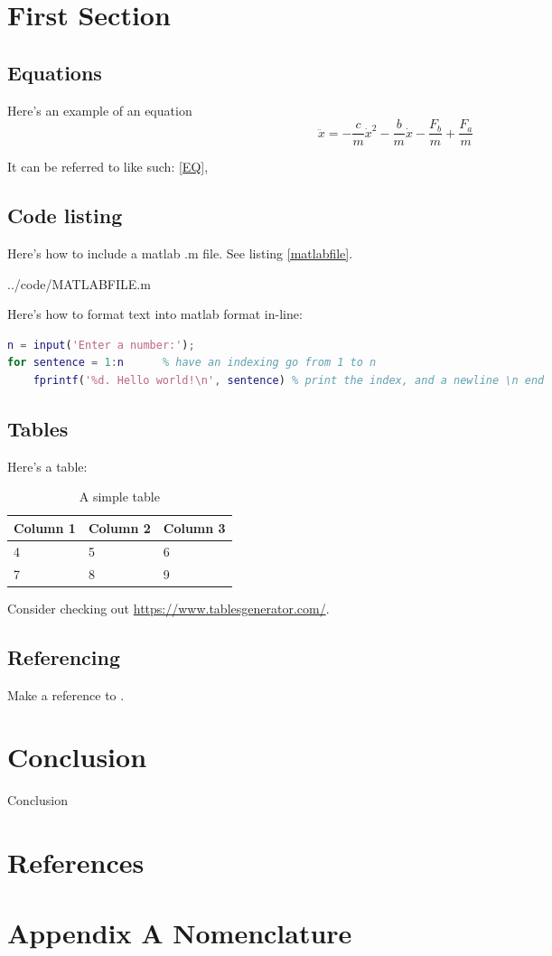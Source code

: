 \documentclass[11pt,a4paper,twoside]{article}
\begin{document}
\section{First Section}


\subsection{Equations}
Here's an example of an equation
\begin{equation}\label{EQ}
\ddot{x}=
-\frac{c}{m}\dot{x}^2
-\frac{b}{m}\dot{x}
-\frac{F_b}{m}
+\frac{F_a}{m}
\end{equation}

It can be referred to like such: \ref{EQ},

\subsection{Code listing}
Here's how to include a matlab .m file. See listing \ref{matlabfile}.


				{../code/MATLABFILE.m}
				

Here's how to format text into matlab format in-line:
\begin{lstlisting}[language=matlab]
% MATLABFILE.m
n = input('Enter a number:');
for sentence = 1:n		% have an indexing go from 1 to n
    fprintf('%d. Hello world!\n', sentence) % print the index, and a newline \n end
\end{lstlisting}


\subsection{Tables}
Here's a table:

\begin{table}[h]
  \centering
    \begin{tabular}{| l l l |}
    \hline
    Column 1 & Column 2 & Column 3 \\
    \hline
    4 & 5 & 6 \\
    7 & 8 & 9 \\
    \hline
    \end{tabular}
  \caption{A simple table}
\end{table}

Consider checking out \url{https://www.tablesgenerator.com/}.

\subsection{Referencing}
Make a reference to \citep{NormanS.Nise2012}.

\section{Conclusion}
Conclusion

\newpage
\section*{References}
\printbibliography[title={\null}]

\newpage
\section*{Appendix A Nomenclature}
\end{document}
